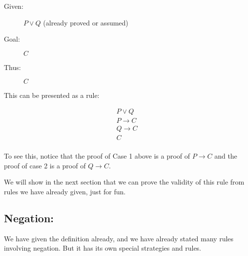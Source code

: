 \documentclass[12pt]{article}
\begin{document}
\begin{description}

\item[Given:]  $P \vee Q$ (already proved or assumed)

\item[Goal:] $C$


\item[Thus:] $C$

\end{description}

This can be presented as a rule:

$$\begin{array}{c}

P \vee Q\\

P \rightarrow C\\

Q \rightarrow C \\ \hline

C \\


\end{array}$$

To see this, notice that the proof of Case 1 above is a proof of $P \rightarrow C$ and the proof of case 2 is a proof of $Q \rightarrow C$.

We will show in the next section that we can prove the validity of this rule from rules we have already given, just for fun.

\subsection{Negation:}

We have given the definition already, and we have already stated many rules involving negation.
But it has its own special strategies and rules.
\end{document}
